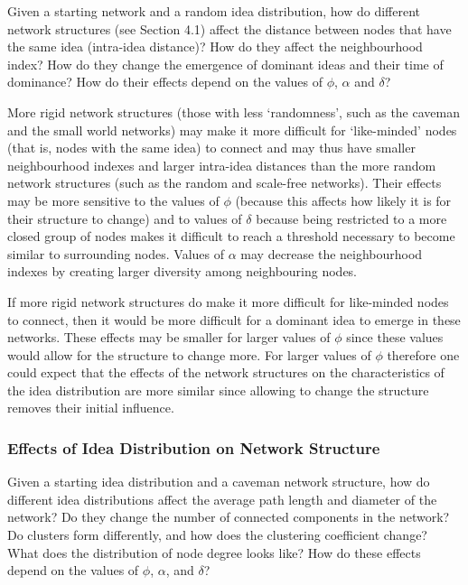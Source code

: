 Given a starting network and a random idea distribution, how do different network structures (see Section 4.1) affect the distance between nodes that have the same idea (intra-idea distance)? How do they affect the neighbourhood index? How do they change the emergence of dominant ideas and their time of dominance? How do their effects depend on the values of $\phi$, $\alpha$ and $\delta$?


More rigid network structures (those with less `randomness', such as the caveman and the small world networks) may make it more difficult for `like-minded' nodes (that is, nodes with the same idea) to connect and may thus have smaller neighbourhood indexes and larger intra-idea distances than the more random network structures (such as the random and scale-free networks). Their effects may be more sensitive to the values of $\phi$ (because this affects how likely it is for their structure to change) and to values of $\delta$ because being restricted to a more closed group of nodes makes it difficult to reach a threshold necessary to become similar to surrounding nodes. Values of $\alpha$ may decrease the neighbourhood indexes by creating larger diversity among neighbouring nodes.

If more rigid network structures do make it more difficult for like-minded nodes to connect, then it would be more difficult for a dominant idea to emerge in these networks. These effects may be smaller for larger values of $\phi$ since these values would allow for the structure to change more. For larger values of $\phi$ therefore one could expect that the effects of the network structures on the characteristics of the idea distribution are more similar since allowing to change the structure removes their initial influence.


\subsubsection{Effects of Idea Distribution on Network Structure}

Given a starting idea distribution and a caveman network structure, how do different idea distributions affect the average path length and diameter of the network? Do they change the number of connected components in the network? Do clusters form differently, and how does the clustering coefficient change? What does the distribution of node degree looks like? How do these effects depend on the values of $\phi$, $\alpha$, and $\delta$?


